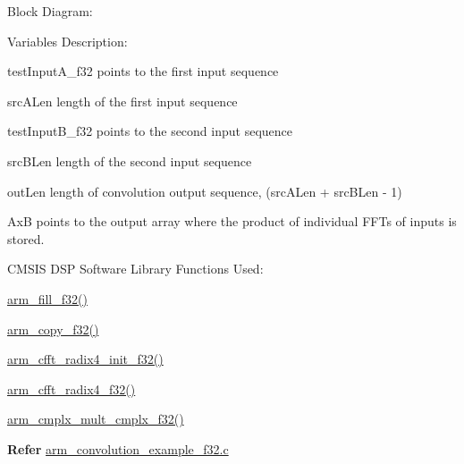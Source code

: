 \begin{DoxyParagraph}{Block Diagram\-:}

\end{DoxyParagraph}
\begin{DoxyParagraph}{}

\end{DoxyParagraph}
\begin{DoxyParagraph}{Variables Description\-:}

\end{DoxyParagraph}
\begin{DoxyParagraph}{}
\begin{DoxyItemize}
\item {\ttfamily test\-Input\-A\-\_\-f32} points to the first input sequence \item {\ttfamily src\-A\-Len} length of the first input sequence \item {\ttfamily test\-Input\-B\-\_\-f32} points to the second input sequence \item {\ttfamily src\-B\-Len} length of the second input sequence \item {\ttfamily out\-Len} length of convolution output sequence, {\ttfamily (src\-A\-Len + src\-B\-Len -\/ 1)} \item {\ttfamily Ax\-B} points to the output array where the product of individual F\-F\-Ts of inputs is stored.\end{DoxyItemize}

\end{DoxyParagraph}
\begin{DoxyParagraph}{C\-M\-S\-I\-S D\-S\-P Software Library Functions Used\-:}

\end{DoxyParagraph}
\begin{DoxyParagraph}{}

\begin{DoxyItemize}
\item \hyperlink{group___fill_ga2248e8d3901b4afb7827163132baad94}{arm\-\_\-fill\-\_\-f32()}
\item \hyperlink{group__copy_gadd1f737e677e0e6ca31767c7001417b3}{arm\-\_\-copy\-\_\-f32()}
\item \hyperlink{group___c_f_f_t___c_i_f_f_t_gaf336459f684f0b17bfae539ef1b1b78a}{arm\-\_\-cfft\-\_\-radix4\-\_\-init\-\_\-f32()}
\item \hyperlink{group___c_f_f_t___c_i_f_f_t_ga521f670cd9c571bc61aff9bec89f4c26}{arm\-\_\-cfft\-\_\-radix4\-\_\-f32()}
\item \hyperlink{group___cmplx_by_cmplx_mult_ga14b47080054a1ba1250a86805be1ff6b}{arm\-\_\-cmplx\-\_\-mult\-\_\-cmplx\-\_\-f32()}
\end{DoxyItemize}
\end{DoxyParagraph}
{\bfseries  Refer } \hyperlink{arm_convolution_example_f32_8c-example}{arm\-\_\-convolution\-\_\-example\-\_\-f32.\-c} 